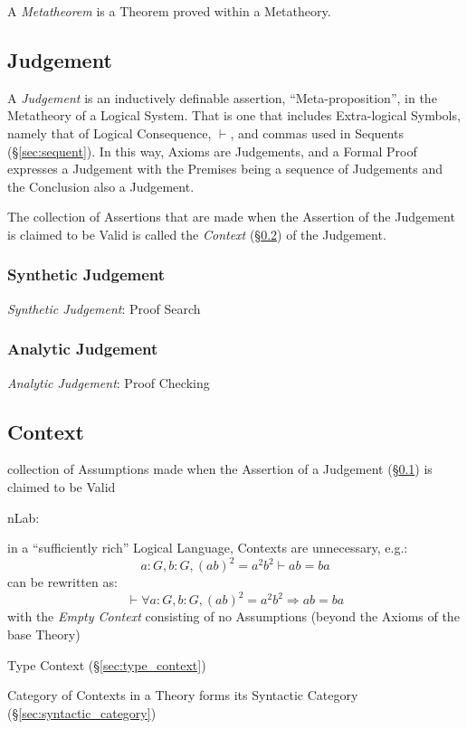A \emph{Metatheorem} is a Theorem proved within a Metatheory.



\subsection{Judgement}\label{sec:judgement}

A \emph{Judgement} is an inductively definable assertion,
``Meta-proposition'', in the Metatheory of a Logical System. That is
one that includes Extra-logical Symbols, namely that of Logical
Consequence, $\vdash$, and commas used in Sequents
(\S\ref{sec:sequent}). In this way, Axioms are Judgements, and a
Formal Proof expresses a Judgement with the Premises being a sequence
of Judgements and the Conclusion also a Judgement.

The collection of Assertions that are made when the Assertion of the
Judgement is claimed to be Valid is called the \emph{Context}
(\S\ref{sec:context}) of the Judgement.



\subsubsection{Synthetic Judgement}\label{sec:synthetic_judgement}

\emph{Synthetic Judgement}: Proof Search



\subsubsection{Analytic Judgement}\label{sec:analytic_judgement}

\emph{Analytic Judgement}: Proof Checking



\subsection{Context}\label{sec:context}

collection of Assumptions made when the Assertion of a Judgement
(\S\ref{sec:judgement}) is claimed to be Valid

nLab:

in a ``sufficiently rich'' Logical Language, Contexts are unnecessary,
e.g.:
\[
  a:G, b:G, (ab)^2 = a^2 b^2 \vdash ab = ba
\]
can be rewritten as:
\[
  \vdash \forall a:G,b:G, (ab)^2 = a^2b^2 \Rightarrow ab = ba
\]
with the \emph{Empty Context} consisting of no Assumptions (beyond the
Axioms of the base Theory)

Type Context (\S\ref{sec:type_context})

Category of Contexts in a Theory forms its Syntactic Category
(\S\ref{sec:syntactic_category})
